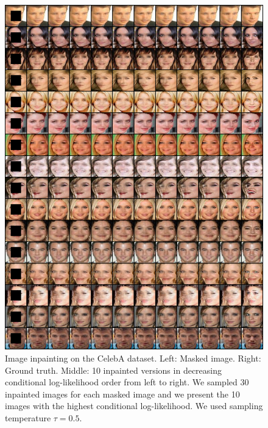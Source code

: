 \begin{figure}[h!]
    \centering
    \includegraphics[width=\textwidth]{Chapter1/paper_graphs/SupplementaryMaterial/inpainting_celebA_T_0.5_1.png}
    \caption{Image inpainting on the CelebA dataset. Left: Masked image. Right: Ground truth. Middle: 10 inpainted versions in decreasing conditional log-likelihood order from left to right. We sampled 30 inpainted images for each masked image and we present the 10 images with the highest conditional log-likelihood. We used sampling temperature $\tau=0.5$.}
\end{figure}
\clearpage
